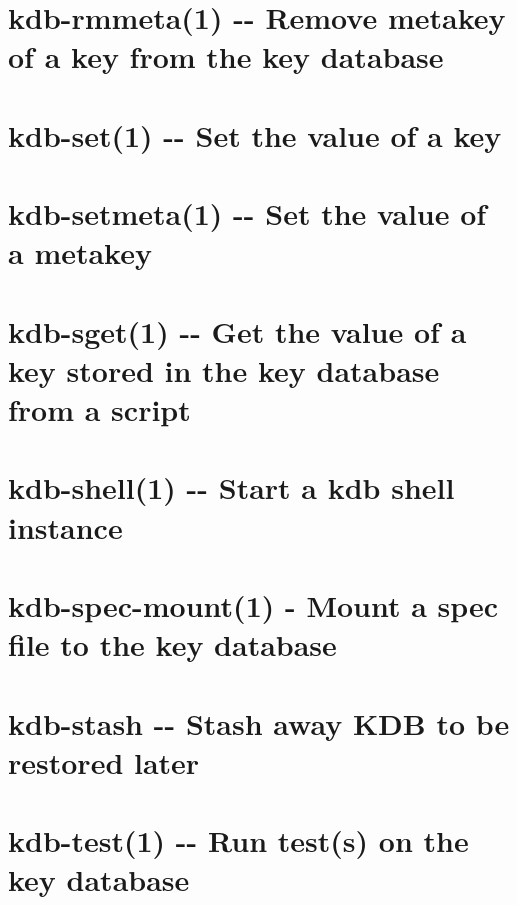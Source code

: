 \documentclass[twoside]{book}
\newcommand{\+}{\discretionary{\mbox{\scriptsize$\hookleftarrow$}}{}{}}
\begin{document}
\chapter{kdb-\/rmmeta(1) -\/-\/ Remove metakey of a key from the key database}
\label{md_doc_help_kdb-rmmeta}

\chapter{kdb-\/set(1) -\/-\/ Set the value of a key}
\label{md_doc_help_kdb-set}

\chapter{kdb-\/setmeta(1) -\/-\/ Set the value of a metakey}
\label{md_doc_help_kdb-setmeta}

\chapter{kdb-\/sget(1) -\/-\/ Get the value of a key stored in the key database from a script}
\label{md_doc_help_kdb-sget}

\chapter{kdb-\/shell(1) -\/-\/ Start a kdb shell instance}
\label{md_doc_help_kdb-shell}

\chapter{kdb-\/spec-\/mount(1) -\/ Mount a spec file to the key database}
\label{md_doc_help_kdb-spec-mount}

\chapter{kdb-\/stash -\/-\/ Stash away K\+DB to be restored later}
\label{md_doc_help_kdb-stash}

\chapter{kdb-\/test(1) -\/-\/ Run test(s) on the key database}
\label{md_doc_help_kdb-test}

\end{document}
